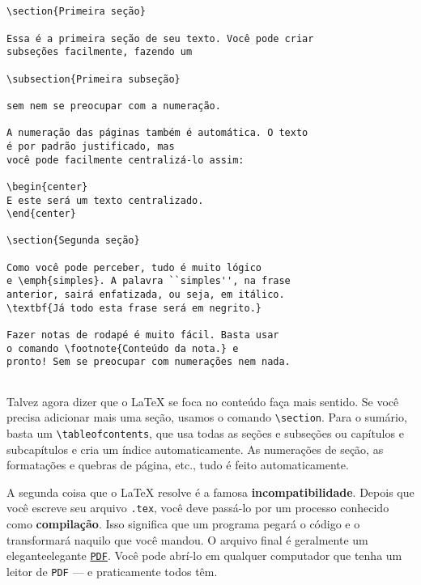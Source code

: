 {\small
\begin{verbatim}


\section{Primeira seção}

Essa é a primeira seção de seu texto. Você pode criar 
subseções facilmente, fazendo um

\subsection{Primeira subseção}

sem nem se preocupar com a numeração. 

A numeração das páginas também é automática. O texto 
é por padrão justificado, mas
você pode facilmente centralizá-lo assim:

\begin{center}
E este será um texto centralizado.
\end{center}

\section{Segunda seção}

Como você pode perceber, tudo é muito lógico 
e \emph{simples}. A palavra ``simples'', na frase 
anterior, sairá enfatizada, ou seja, em itálico. 
\textbf{Já todo esta frase será em negrito.}

Fazer notas de rodapé é muito fácil. Basta usar 
o comando \footnote{Conteúdo da nota.} e 
pronto! Sem se preocupar com numerações nem nada.


\end{verbatim}
}

Talvez agora dizer que o \LaTeX{} se foca no conteúdo faça mais sentido. Se você precisa adicionar mais uma seção, usamos o comando \verb+\section+. Para o sumário, basta um \verb+\tableofcontents+, que usa todas as seções e subseções ou capítulos e subcapítulos e cria um índice automaticamente. As numerações de seção, as formatações e quebras de página, etc., tudo é feito automaticamente.

A segunda coisa que o \LaTeX{} resolve é a famosa \textbf{incompatibilidade}. Depois que você escreve seu arquivo \texttt{.tex}, você deve passá-lo por um processo conhecido como \textbf{compilação}. Isso significa que um programa pegará o código e o transformará naquilo que você mandou. O arquivo final é geralmente um eleganteelegante  \href{http://pt.wikipedia.org/wiki/Portable_Document_Format}{\texttt{PDF}}. Você pode abrí-lo em qualquer computador que tenha um leitor de \texttt{PDF} --- e praticamente todos têm.

